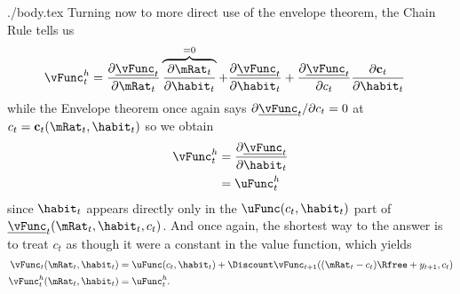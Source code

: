 \documentclass{handout}
\begin{document}
\begin{verbatimwrite}{./body.tex}
Turning now to more direct use of the envelope theorem, the Chain Rule
tells us
\begin{equation*}\begin{gathered}\begin{aligned}
        \vFunc_{t}^{h} & =  \frac{\partial \underline{\vFunc}_{t}}{\partial \mRat_{t}}
        \overbrace{\frac{\partial \mRat_{t}}{\partial \habit_{t}}}^{=0}
+ \frac{\partial \underline{\vFunc}_{t}}{\partial \habit_{t}}
+ \frac{\partial \underline{\vFunc}_{t}}{\partial c_{t}}\frac{\partial \mathbf{c}_{t}}{\partial \habit_{t}}
\end{aligned}\end{gathered}\end{equation*}
while the Envelope theorem once again says $\partial \underline{\vFunc}_{t}/\partial
c_{t} = 0$ at $c_{t}=\mathbf{c}_{t}(\mRat_{t},\habit_{t})$ so we obtain
\begin{equation}\begin{gathered}\begin{aligned}
        \vFunc_{t}^{h} & =  \frac{\partial \underline{\vFunc}_{t}}{\partial \habit_{t}}  \\
         & =  \uFunc_{t}^{h}
\end{aligned}\end{gathered}\end{equation}
since $\habit_{t}$ appears directly only in the $\uFunc(c_{t},\habit_{t})$ part of 
$\underline{\vFunc}_{t}(\mRat_{t},\habit_{t},c_{t})$.  And once again, the shortest way to
the answer is to treat $c_{t}$ as though it were a constant in 
the value function, which yields
\begin{equation}\begin{gathered}\begin{aligned}
        \vFunc_{t}(\mRat_t,\habit_{t}) & =  \uFunc(c_{t},\habit_{t})+\Discount \vFunc_{t+1}((\mRat_{t}-c_{t})\Rfree+y_{t+1},c_{t})  \\
        \vFunc_{t}^{h}(\mRat_{t},\habit_{t}) & =  \uFunc_{t}^{h}.
\end{aligned}\end{gathered}\end{equation}


\end{verbatimwrite}
\end{document}
